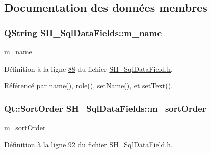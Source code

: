 \subsection{Documentation des données membres}
\hypertarget{classSH__SqlDataFields_a3c0e82a8b6652335bdc53b211d39d4e2}{
\subsubsection[{m\-\_\-name}]{\setlength{\rightskip}{0pt plus 5cm}Q\-String S\-H\-\_\-\-Sql\-Data\-Fields\-::m\-\_\-name\hspace{0.3cm}{\ttfamily [private]}}}\label{classSH__SqlDataFields_a3c0e82a8b6652335bdc53b211d39d4e2}


m\-\_\-name 



Définition à la ligne \hyperlink{SH__SqlDataField_8h_source_l00088}{88} du fichier \hyperlink{SH__SqlDataField_8h_source}{S\-H\-\_\-\-Sql\-Data\-Field.\-h}.



Référencé par \hyperlink{classSH__SqlDataFields_a4951291928ce837435411166d66a5a3f}{name()}, \hyperlink{classSH__SqlDataFields_a6e5a9b95f0249a85ccf2fd0844ab7170}{role()}, \hyperlink{classSH__SqlDataFields_a8d7b864a4ad5513af9e4c47a0d9919e8}{set\-Name()}, et \hyperlink{classSH__SqlDataFields_ae098408de73ecbd532de8f44dea2b6d0}{set\-Text()}.

\hypertarget{classSH__SqlDataFields_aa5dbfa2beef7114fba275d61135a6760}{
\subsubsection[{m\-\_\-sort\-Order}]{\setlength{\rightskip}{0pt plus 5cm}Qt\-::\-Sort\-Order S\-H\-\_\-\-Sql\-Data\-Fields\-::m\-\_\-sort\-Order\hspace{0.3cm}{\ttfamily [private]}}}\label{classSH__SqlDataFields_aa5dbfa2beef7114fba275d61135a6760}


m\-\_\-sort\-Order 



Définition à la ligne \hyperlink{SH__SqlDataField_8h_source_l00092}{92} du fichier \hyperlink{SH__SqlDataField_8h_source}{S\-H\-\_\-\-Sql\-Data\-Field.\-h}.



